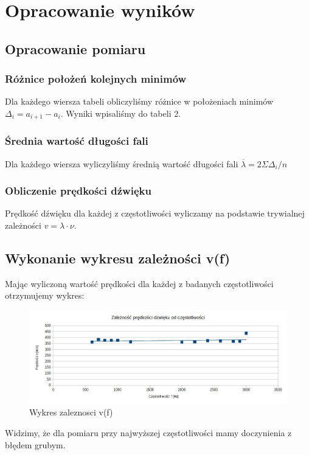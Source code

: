 \documentclass{article}
\begin{document}
\section{Opracowanie wyników}

\subsection{Opracowanie pomiaru}
\subsubsection{Różnice położeń kolejnych minimów}
Dla każdego wiersza tabeli obliczyliśmy różnice w położeniach minimów $\Delta_{i} = a_{i+1}-a_{i}$. Wyniki wpisaliśmy do tabeli 2.
\subsubsection{Średnia wartość długości fali}
Dla każdego wiersza wyliczyliśmy średnią wartość długości fali $\overline{\lambda} = 2 \Sigma \Delta_{i}/n$
\subsubsection{Obliczenie prędkości dźwięku}
Prędkość dźwięku dla każdej z częstotliwości wyliczamy na podstawie trywialnej zależności $v = \lambda \cdot \nu$. 

\subsection{Wykonanie wykresu zależności v(f)}
Mając wyliczoną wartość prędkości dla każdej z badanych częstotliwości otrzymujemy wykres:

\begin{figure}[h!]
	\centering
	\includegraphics[scale=0.5]{ch01}
	\caption{Wykres zaleznosci v(f)}
\end{figure}

Widzimy, że dla pomiaru przy najwyższej częstotliwości mamy doczynienia z błędem grubym.
\end{document}
